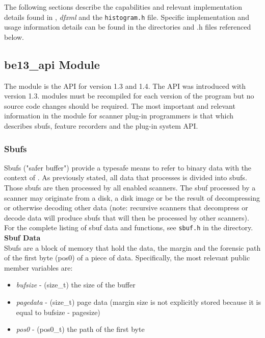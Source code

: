 \documentclass[11pt,fleqn]{article} %
\begin{document}
The following sections describe the capabilities and relevant implementation details found in \beapi, \textit{dfxml} and the \texttt{histogram.h} file. Specific implementation and usage information details can be found in the directories and .h files referenced below. 

\subsection{be13\_api Module}
The \beapi module is the API for \bulk version 1.3 and 1.4. The API was introduced with \bulk version 1.3. \bulk modules must be recompiled for each version of the program but no source code changes should be required. The most important and relevant information in the module for scanner plug-in programmers is that which describes sbufs, feature recorders and the plug-in system API.

\subsubsection{Sbufs}
Sbufs ("safer buffer") provide a typesafe means to refer to binary data with the context of \bulk. As previously stated, all data that \bulk processes is divided into sbufs. Those sbufs are then processed by all enabled scanners. The sbuf processed by a scanner may originate from a disk, a disk image or be the result of decompressing or otherwise decoding other data (note: recursive scanners that decompress or decode data will produce sbufs that will then be processed by other scanners). For the complete listing of sbuf data and functions, see \texttt{sbuf.h} in the \beapi directory.\\

\textbf{Sbuf Data} \\
Sbufs are a block of memory that hold the data, the margin and the forensic path of the first byte (pos0) of a piece of data. Specifically, the most relevant public member variables are: 
\begin{itemize}
\item \textit{bufsize} - (size\_t) the size of the buffer
\item \textit{pagedata}  - (size\_t) page data (margin size is not explicitly stored because it is equal to bufsize - pagesize) 
\item \textit{pos0} - (pos0\_t) the path of the first byte 
\end{itemize}
\end{document}
